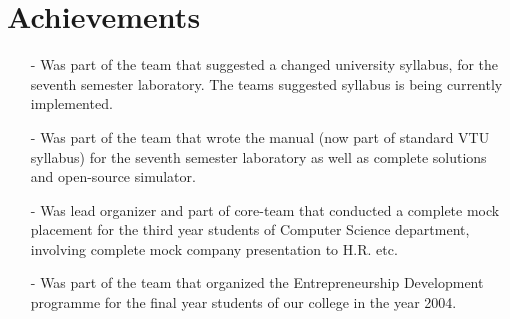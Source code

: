 \documentclass[a4paper,11pt]{article}
\begin{document}
\section{Achievements}

\begin{itemize}

  \item[-] Was part of the team that suggested a changed university syllabus, for the seventh semester laboratory. The teams suggested syllabus is being currently implemented.
  \item[-] Was part of the team that wrote the manual (now part of
  standard VTU syllabus) for the seventh
  semester laboratory as well as complete solutions and open-source
  simulator.
  \item[-] Was lead organizer and part of core-team that conducted a complete mock placement for the third year students of Computer Science department, involving complete mock company presentation to H.R. etc.
  \item[-] Was part of the team that organized the Entrepreneurship Development programme for the final year students of our college in the year 2004.
\end{itemize}
\end{document}
